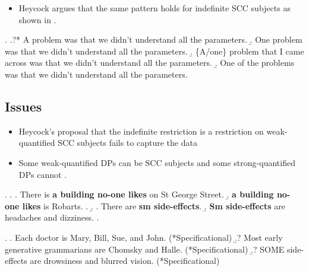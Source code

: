 \documentclass[letterpaper]{article}
\begin{document}
\begin{itemize}
  \item Heycock argues that the same pattern holds for indefinite SCC subjects as shown in \Next.
\end{itemize}
\ex.
\a.?* A problem was that we didn't understand all the parameters.
\b. One problem was that we didn't understand all the parameters.
\b. \{A/one\} problem that I came across was that we didn't understand all the parameters.
\b. One of the problems was that we didn't understand all the parameters.\hfill\parencite{heycock2012specification}

\subsection{Issues}
\begin{itemize}
  \item Heycock's proposal that the indefinite restriction is a restriction on weak-quantified SCC subjects fails to capture the data
  \item Some weak-quantified DPs can be SCC subjects \Next and some strong-quantified DPs cannot \NNext. 
\end{itemize}
\ex.
\a.
\a. There is \textbf{a building no-one likes} on St George Street.
\b. \textbf{a building no-one likes} is Robarts.
\z.
\b.
\a. There are \textbf{sm side-effects}.
\b. \textbf{Sm side-effects} are headaches and dizziness. 
\z.

\ex.
\a. Each doctor is Mary, Bill, Sue, and John. (*Specificational)
\b.? Most early generative grammarians are Chomsky and Halle. (*Specificational)
\b.? SOME side-effects are drowsiness and blurred vision. (*Specificational)
\end{document}
